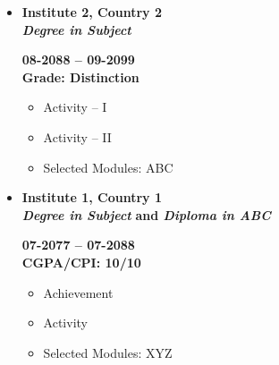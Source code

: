 \vspace{-0.5cm}
\makebox[\linewidth]{\rule{\linewidth}{1.1pt}}
\vspace{-0.5cm}
\begin{itemize} %
	\item \begin{multicols}{2}	
		\begin{flushleft}
			\textbf{Institute 2, Country 2}  \\
			\textbf{\textit{Degree in Subject}}
		\end{flushleft}
		\columnbreak
		\begin{flushright}
			\textbf{08-2088 -- 09-2099}  \\
			\textbf{Grade: \textbf{Distinction}}
		\end{flushright}
	\end{multicols}
	\vspace{-0.25cm}
	\begin{itemize}
		\item Activity -- I
		\item Activity -- II
		\item Selected Modules: ABC
	\end{itemize}
	\vspace{-0.25cm}
	\item \begin{multicols}{2}
		\begin{flushleft}
			\textbf{Institute 1, Country 1} \\
			\textbf{\textit{Degree in Subject}} \textbf{and \textit{Diploma in ABC}}
		\end{flushleft}
		\columnbreak
		\begin{flushright}
			\textbf{07-2077 -- 07-2088 } \\
			\textbf{CGPA/CPI: 10/10}
		\end{flushright}
	\end{multicols}
	\vspace{-0.25cm}
	\begin{itemize}
		\item Achievement
		\item Activity
		\item Selected Modules: XYZ
		
	\end{itemize}
\end{itemize}

